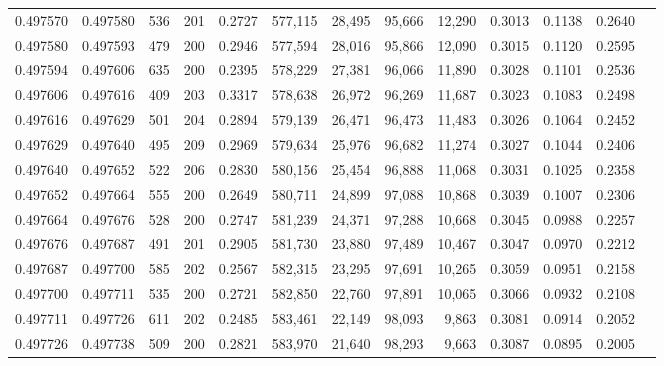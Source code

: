 \begin{tabular}{rrrrrrrrrrrrr}
0.497570 & 0.497580 &   536 & 201 &                                     0.2727 & 577,115 &  28,495 &  95,666 &  12,290 & 0.3013 & 0.1138 & 0.2640 \\
0.497580 & 0.497593 &   479 & 200 &                                     0.2946 & 577,594 &  28,016 &  95,866 &  12,090 & 0.3015 & 0.1120 & 0.2595 \\
0.497594 & 0.497606 &   635 & 200 &                                     0.2395 & 578,229 &  27,381 &  96,066 &  11,890 & 0.3028 & 0.1101 & 0.2536 \\
0.497606 & 0.497616 &   409 & 203 &                                     0.3317 & 578,638 &  26,972 &  96,269 &  11,687 & 0.3023 & 0.1083 & 0.2498 \\
0.497616 & 0.497629 &   501 & 204 &                                     0.2894 & 579,139 &  26,471 &  96,473 &  11,483 & 0.3026 & 0.1064 & 0.2452 \\
0.497629 & 0.497640 &   495 & 209 &                                     0.2969 & 579,634 &  25,976 &  96,682 &  11,274 & 0.3027 & 0.1044 & 0.2406 \\
0.497640 & 0.497652 &   522 & 206 &                                     0.2830 & 580,156 &  25,454 &  96,888 &  11,068 & 0.3031 & 0.1025 & 0.2358 \\
0.497652 & 0.497664 &   555 & 200 &                                     0.2649 & 580,711 &  24,899 &  97,088 &  10,868 & 0.3039 & 0.1007 & 0.2306 \\
0.497664 & 0.497676 &   528 & 200 &                                     0.2747 & 581,239 &  24,371 &  97,288 &  10,668 & 0.3045 & 0.0988 & 0.2257 \\
0.497676 & 0.497687 &   491 & 201 &                                     0.2905 & 581,730 &  23,880 &  97,489 &  10,467 & 0.3047 & 0.0970 & 0.2212 \\
0.497687 & 0.497700 &   585 & 202 &                                     0.2567 & 582,315 &  23,295 &  97,691 &  10,265 & 0.3059 & 0.0951 & 0.2158 \\
0.497700 & 0.497711 &   535 & 200 &                                     0.2721 & 582,850 &  22,760 &  97,891 &  10,065 & 0.3066 & 0.0932 & 0.2108 \\
0.497711 & 0.497726 &   611 & 202 &                                     0.2485 & 583,461 &  22,149 &  98,093 &   9,863 & 0.3081 & 0.0914 & 0.2052 \\
0.497726 & 0.497738 &   509 & 200 &                                     0.2821 & 583,970 &  21,640 &  98,293 &   9,663 & 0.3087 & 0.0895 & 0.2005 \\

\end{tabular}
